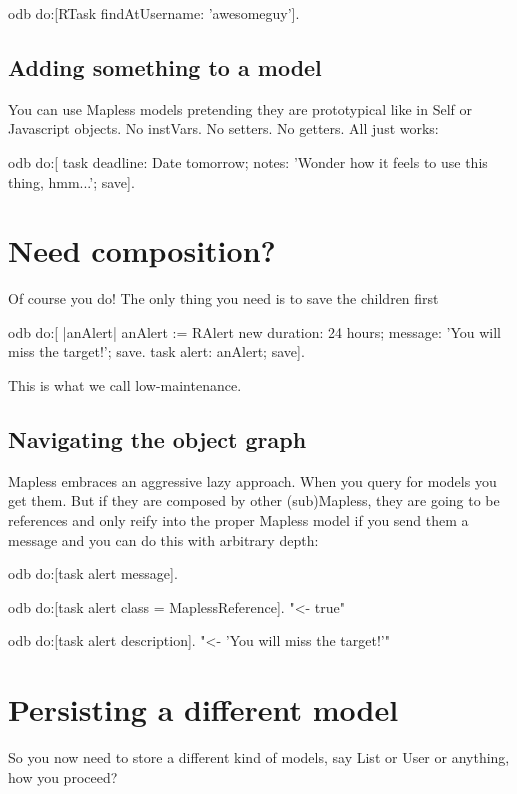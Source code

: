 \documentclass[a4paper,10pt,twoside]{book}
\begin{document}
\begin{code}{}
odb do:[RTask findAtUsername: 'awesomeguy'].
\end{code}

\subsection{ Adding something to a model}
You can use Mapless models pretending they are prototypical like in Self or Javascript objects. No instVars. No setters. No getters. All just works:


\begin{code}{}
odb do:[
    task 
        deadline: Date tomorrow; 
        notes: 'Wonder how it feels to use this thing, hmm...';
        save].
\end{code}

\section{Need composition?}
Of course you do! The only thing you need is to save the children first


\begin{code}{}
odb do:[ |anAlert|
  anAlert := RAlert new 
                duration: 24 hours;
                message: 'You will miss the target!';
                save.
    task 
        alert: anAlert;
        save].
\end{code}


This is what we call low-maintenance.
\subsection{ Navigating the object graph}
Mapless embraces an aggressive lazy approach. When you query for models you get them. But if they are composed by other (sub)Mapless, they are going to be references and only reify into the proper Mapless model if you send them a message and you can do this with arbitrary depth:


\begin{code}{}
odb do:[task alert message].   

odb do:[task alert class = MaplessReference].  "<- true"   

odb do:[task alert description].  "<- 'You will miss the target!'"   
\end{code}

\section{ Persisting a different model}
So you now need to store a different kind of models, say List or User or anything, how you proceed?
\end{document}
